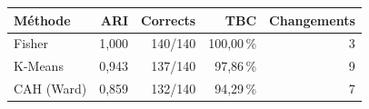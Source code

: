 \begin{tabular}{lrrrr}
\toprule
Méthode & ARI & Corrects & TBC & Changements \\
\midrule
Fisher & 1{,}000 & 140/140 & 100{,}00\,\% & 3 \\
K-Means & 0{,}943 & 137/140 & 97{,}86\,\% & 9 \\
CAH (Ward) & 0{,}859 & 132/140 & 94{,}29\,\% & 7 \\
\bottomrule
\end{tabular}
